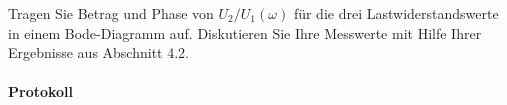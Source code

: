 \documentclass[10pt]{scrreprt}
\begin{document}
        \vspace{0.5cm}

        Tragen Sie Betrag und Phase von $U_2 /U_1 (\omega)$ für die drei Lastwiderstandswerte in
        einem Bode-Diagramm auf. Diskutieren Sie Ihre Messwerte mit Hilfe Ihrer Ergebnisse aus
        Abschnitt 4.2.

        \paragraph{Protokoll}
\end{document}
